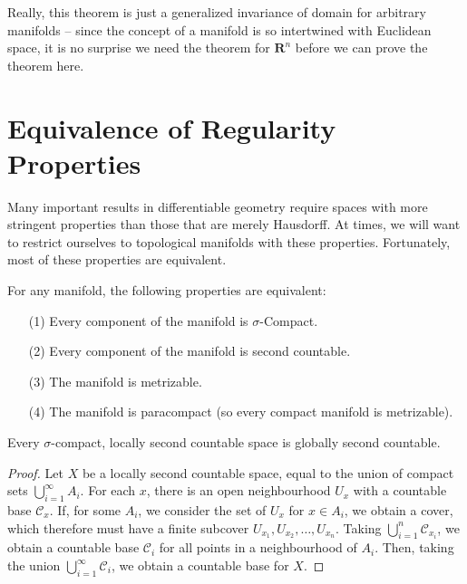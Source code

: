 Really, this theorem is just a generalized invariance of domain for arbitrary manifolds -- since the concept of a manifold is so intertwined with Euclidean space, it is no surprise we need the theorem for $\mathbf{R}^n$ before we can prove the theorem here.

\section{Equivalence of Regularity Properties}

Many important results in differentiable geometry require spaces with more stringent properties than those that are merely Hausdorff. At times, we will want to restrict ourselves to topological manifolds with these properties. Fortunately, most of these properties are equivalent.

\begin{theorem}
    For any manifold, the following properties are equivalent:
    \begin{enumerate}
        \item[(1)] Every component of the manifold is $\sigma$-Compact.
        \item[(2)] Every component of the manifold is second countable.
        \item[(3)] The manifold is metrizable.
        \item[(4)] The manifold is paracompact (so every compact manifold is metrizable).
    \end{enumerate}
\end{theorem}

\begin{lemma}[$1) \to (2$]
    Every $\sigma$-compact, locally second countable space is globally second countable.
\end{lemma}
\begin{proof}
    Let $X$ be a locally second countable space, equal to the union of compact sets $\bigcup_{i = 1}^\infty A_i$. For each $x$, there is an open neighbourhood $U_x$ with a countable base $\mathcal{C}_x$. If, for some $A_i$, we consider the set of $U_x$ for $x \in A_i$, we obtain a cover, which therefore must have a finite subcover $U_{x_1}, U_{x_2}, \dots, U_{x_n}$. Taking $\bigcup_{i = 1}^n \mathcal{C}_{x_i}$, we obtain a countable base $\mathcal{C}_i$ for all points in a neighbourhood of $A_i$. Then, taking the union $\bigcup_{i = 1}^\infty \mathcal{C}_i$, we obtain a countable base for $X$.
\end{proof}

